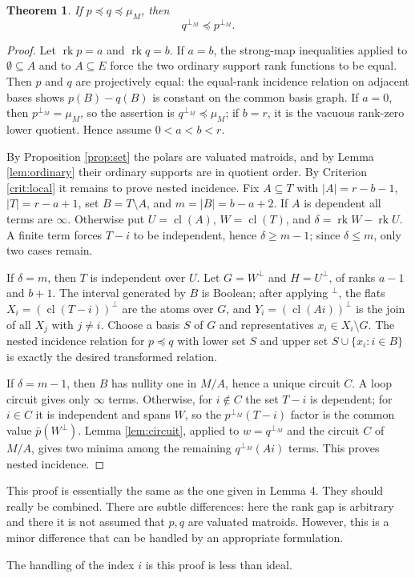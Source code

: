 \documentclass[12pt]{article}
\newcommand{\rk}{\operatorname{rk}}
\newcommand{\cl}{\operatorname{cl}}
\newtheorem{theorem}{Theorem}
\newcommand{\review}[1]{\begin{reviewbox}#1\end{reviewbox}}
\begin{document}
\begin{theorem}\label{thm:order}
If $p\preceq q\preceq\mu_M$, then
\[
        q^{\perp_M}\preceq p^{\perp_M}.
\]
\end{theorem}

\begin{proof}
Let $\rk p=a$ and $\rk q=b$.  If $a=b$, the strong-map inequalities applied to
$\emptyset\subseteq A$ and to $A\subseteq E$ force the two ordinary
support rank functions to be equal.  Then $p$ and $q$ are projectively
equal: the equal-rank incidence relation on adjacent bases shows
$p(B)-q(B)$ is constant on the common basis graph.  If $a=0$, then $p^{\perp_M}=\mu_M$, so the
assertion is $q^{\perp_M}\preceq\mu_M$; if $b=r$, it is the vacuous
rank-zero lower quotient.  Hence assume $0<a<b<r$.

By Proposition \ref{prop:set} the polars are valuated matroids, and by
Lemma \ref{lem:ordinary} their ordinary supports are in quotient order.
By Criterion \ref{crit:local} it remains to prove nested incidence.
Fix $A\subseteq T$ with
$|A|=r-b-1$, $|T|=r-a+1$, set $B=T\setminus A$, and
$m=|B|=b-a+2$.  If $A$ is dependent all terms are $\infty$.  Otherwise
put $U=\cl(A)$, $W=\cl(T)$, and $\delta=\rk W-\rk U$.  A finite term
forces $T-i$ to be independent, hence $\delta\ge m-1$; since
$\delta\le m$, only two cases remain.

If $\delta=m$, then $T$ is independent over $U$.  Let $G=W^\perp$ and
$H=U^\perp$, of ranks $a-1$ and $b+1$.  The interval generated by $B$
is Boolean; after applying $^\perp$, the flats
$X_i=(\cl(T-i))^\perp$ are the atoms over $G$, and
$Y_i=(\cl(Ai))^\perp$ is the join of all $X_j$ with $j\ne i$.  Choose a
basis $S$ of $G$ and representatives $x_i\in X_i\setminus G$.  The
nested incidence relation for $p\preceq q$ with lower set $S$ and upper
set $S\cup\{x_i:i\in B\}$ is exactly the desired transformed relation.

If $\delta=m-1$, then $B$ has nullity one in $M/A$, hence a unique
circuit $C$.  A loop circuit gives only $\infty$ terms.  Otherwise, for
$i\notin C$ the set $T-i$ is dependent; for $i\in C$ it is independent
and spans $W$, so the $p^{\perp_M}(T-i)$ factor is the common value
$\bar p(W^\perp)$.  Lemma \ref{lem:circuit}, applied to
$w=q^{\perp_M}$ and the circuit $C$ of $M/A$, gives two minima among
the remaining $q^{\perp_M}(Ai)$ terms.  This proves nested incidence.
\end{proof}
\review{This proof is essentially the same as the one given in Lemma 4. They should really be combined. There are subtle differences: here the rank gap is arbitrary and there it is not assumed that $p, q$ are valuated matroids. However, this is a minor difference that can be handled by an appropriate formulation.

The handling of the index $i$ is this proof is less than ideal.}
\end{document}
